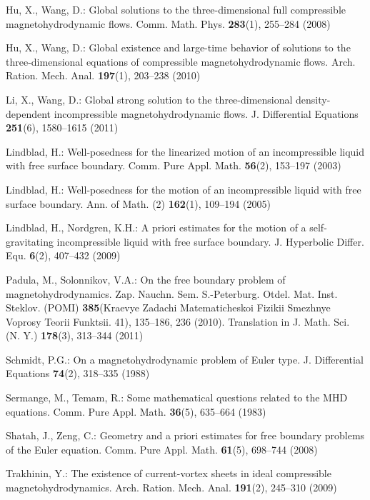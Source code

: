 \documentclass[12pt,reqno]{amsart}
\numberwithin{equation}{section}
\theoremstyle{definition}
\theoremstyle{remark}
\begin{document}
\begin{thebibliography}{10}
Hu, X., Wang, D.: Global solutions to the three-dimensional full compressible
  magnetohydrodynamic flows.
\newblock Comm. Math. Phys. \textbf{283}(1), 255--284 (2008)

Hu, X., Wang, D.: Global existence and large-time behavior of solutions to the
  three-dimensional equations of compressible magnetohydrodynamic flows.
\newblock Arch. Ration. Mech. Anal. \textbf{197}(1), 203--238 (2010)

Li, X., Wang, D.: Global strong solution to the three-dimensional
  density-dependent incompressible magnetohydrodynamic flows.
\newblock J. Differential Equations \textbf{251}(6), 1580--1615 (2011)

Lindblad, H.: Well-posedness for the linearized motion of an incompressible
  liquid with free surface boundary.
\newblock Comm. Pure Appl. Math. \textbf{56}(2), 153--197 (2003)

Lindblad, H.: Well-posedness for the motion of an incompressible liquid with
  free surface boundary.
\newblock Ann. of Math. (2) \textbf{162}(1), 109--194 (2005)

Lindblad, H., Nordgren, K.H.: A priori estimates for the motion of a
  self-gravitating incompressible liquid with free surface boundary.
\newblock J. Hyperbolic Differ. Equ. \textbf{6}(2), 407--432 (2009)

Padula, M., Solonnikov, V.A.: On the free boundary problem of
  magnetohydrodynamics.
\newblock Zap. Nauchn. Sem. S.-Peterburg. Otdel. Mat. Inst. Steklov. (POMI)
  \textbf{385}(Kraevye Zadachi Matematicheskoi Fizikii Smezhnye Voprosy Teorii
  Funktsii. 41), 135--186, 236 (2010).
\newblock Translation in J. Math. Sci. (N. Y.) \textbf{178}(3), 313--344 (2011)

Schmidt, P.G.: On a magnetohydrodynamic problem of {E}uler type.
\newblock J. Differential Equations \textbf{74}(2), 318--335 (1988)

Sermange, M., Temam, R.: Some mathematical questions related to the {MHD}
  equations.
\newblock Comm. Pure Appl. Math. \textbf{36}(5), 635--664 (1983)

Shatah, J., Zeng, C.: Geometry and a priori estimates for free boundary
  problems of the {E}uler equation.
\newblock Comm. Pure Appl. Math. \textbf{61}(5), 698--744 (2008)

Trakhinin, Y.: The existence of current-vortex sheets in ideal compressible
  magnetohydrodynamics.
\newblock Arch. Ration. Mech. Anal. \textbf{191}(2), 245--310 (2009)


\end{thebibliography}
\end{document}
